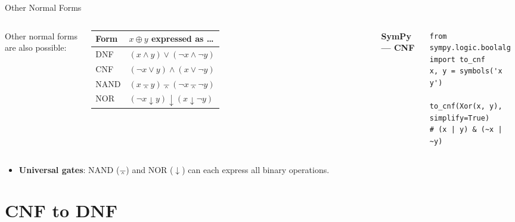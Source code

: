 \documentclass[aspectratio=169]{beamer}
\newcommand{\codelabel}[1]{\textbf{\footnotesize\color{dmDarkBlue}#1}\par\smallskip}
\begin{document}
\begin{frame}[fragile]{Other Normal Forms}
  \begin{columns}[T]
      Other normal forms are also possible:

      \medskip
      \footnotesize
      \renewcommand{\arraystretch}{1.3}
      \begin{tabular}{ll}
        \toprule
        \textbf{Form} & \textbf{$x \oplus y$ expressed as \ldots} \\
        \midrule
        DNF  & $(x \land y) \lor (\lnot x \land \lnot y)$ \\
        \rowcolor{rowHigh}
        CNF  & $(\lnot x \lor y) \land (x \lor \lnot y)$ \\
        NAND & $(x \barwedge y) \barwedge (\lnot x \barwedge \lnot y)$ \\
        NOR  & $(\lnot x \downarrow y) \downarrow (x \downarrow \lnot y)$ \\
        \bottomrule
      \end{tabular}
      \normalsize

      \codelabel{SymPy — CNF}
\begin{lstlisting}[style=python]
from sympy.logic.boolalg import to_cnf
x, y = symbols('x y')

to_cnf(Xor(x, y), simplify=True)
# (x | y) & (~x | ~y)
\end{lstlisting}
  \end{columns}

  \bigskip
  \begin{itemize}
    \item \textbf{Universal gates}: NAND ($\barwedge$) and NOR ($\downarrow$)
          can each express all binary operations.
  \end{itemize}
\end{frame}

\section{CNF to DNF}
\end{document}
